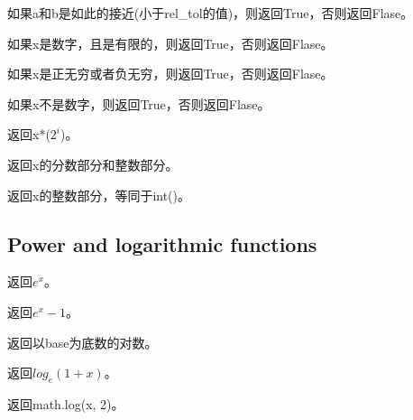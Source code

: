 \noindent{\color{red}{math.isclose(a, b, *, rel\_tol=1e-09, abs\_tol=0.0):}}
\par{如果a和b是如此的接近(小于rel\_tol的值)，则返回True，否则返回Flase。}\\

\noindent{\color{red}{math.isfinite(x):}}
\par{如果x是数字，且是有限的，则返回True，否则返回Flase。}\\

\noindent{\color{red}{math.isinf(x):}}
\par{如果x是正无穷或者负无穷，则返回True，否则返回Flase。}\\

\noindent{\color{red}{math.isnan(x):}}
\par{如果x不是数字，则返回True，否则返回Flase。}\\

\noindent{\color{red}{math.ldexp(x, i):}}
\par{返回x*($2^i$)。}\\

\noindent{\color{red}{math.modf(x):}}
\par{返回x的分数部分和整数部分。}\\

\noindent{\color{red}{math.trunc(x):}}
\par{返回x的整数部分，等同于int()。}\\

\subsection{Power and logarithmic functions}
\noindent{\color{red}{math.exp(x):}}
\par{返回$e^x$。}\\

\noindent{\color{red}{math.expm1(x):}}
\par{返回$e^x-1$。}\\

\noindent{\color{red}{math.log(x[, base]):}}
\par{返回以base为底数的对数。}\\

\noindent{\color{red}{math.loglp(x):}}
\par{返回$log_{e}(1+x)$。}\\

\noindent{\color{red}{math.log2(x):}}
\par{返回math.log(x, 2)。}\\


